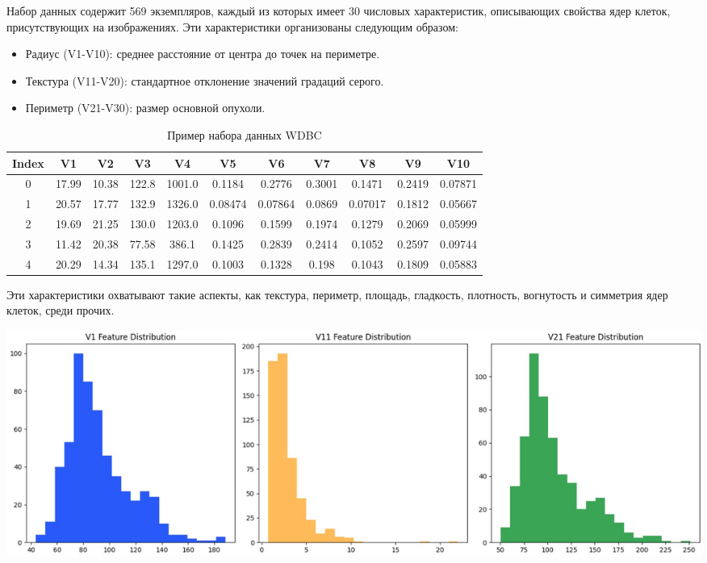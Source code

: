 \documentclass{article}
\begin{document}
Набор данных содержит 569 экземпляров, каждый из которых имеет 30 числовых характеристик, описывающих свойства ядер клеток, присутствующих на изображениях. Эти характеристики организованы следующим образом:

\begin{itemize}
    \item Радиус (V1-V10): среднее расстояние от центра до точек на периметре.
    \item Текстура (V11-V20): стандартное отклонение значений градаций серого.
    \item Периметр (V21-V30): размер основной опухоли.
\end{itemize}

\begin{table}[h]
\centering
\caption{Пример набора данных WDBC}
\label{table:data}
\begin{tabular}{|c|c|c|c|c|c|c|c|c|c|c|}
\hline
Index & V1    & V2    & V3    & V4     & V5     & V6     & V7     & V8     & V9     & V10    \\ \hline
0     & 17.99 & 10.38 & 122.8 & 1001.0 & 0.1184 & 0.2776 & 0.3001 & 0.1471 & 0.2419 & 0.07871\\ \hline
1     & 20.57 & 17.77 & 132.9 & 1326.0 & 0.08474& 0.07864& 0.0869 & 0.07017& 0.1812 & 0.05667\\ \hline
2     & 19.69 & 21.25 & 130.0 & 1203.0 & 0.1096 & 0.1599 & 0.1974 & 0.1279 & 0.2069 & 0.05999\\ \hline
3     & 11.42 & 20.38 & 77.58 & 386.1  & 0.1425 & 0.2839 & 0.2414 & 0.1052 & 0.2597 & 0.09744\\ \hline
4     & 20.29 & 14.34 & 135.1 & 1297.0 & 0.1003 & 0.1328 & 0.198  & 0.1043 & 0.1809 & 0.05883\\ \hline
\end{tabular}
\end{table}

Эти характеристики охватывают такие аспекты, как текстура, периметр, площадь, гладкость, плотность, вогнутость и симметрия ядер клеток, среди прочих.

\begin{center}
    \includegraphics[width=\textwidth]{figures/parameters.jpg}
\end{center}
\end{document}
